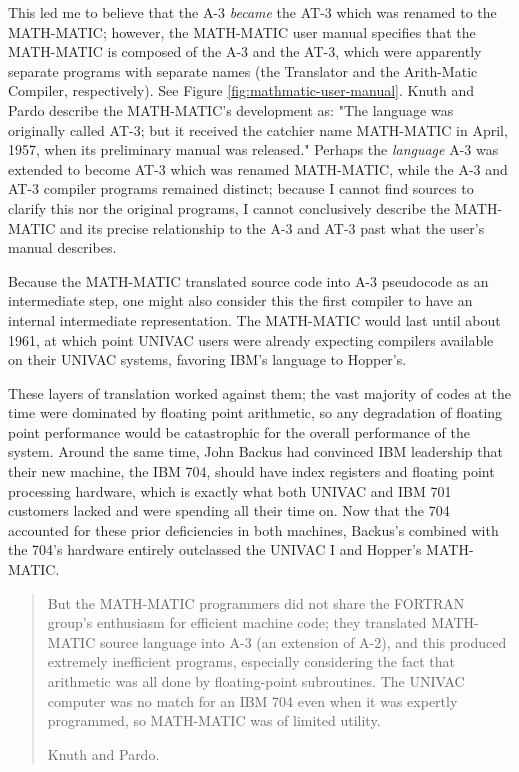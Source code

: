 This led me to believe that the A-3 \textit{became} the AT-3 which was
renamed to the MATH-MATIC; however, the MATH-MATIC user manual
\cite{ash_etal_1957_math-matic_manual} specifies that the MATH-MATIC
is composed of the A-3 and the AT-3, which were apparently separate
programs with separate names (the Translator and the Arith-Matic Compiler,
respectively).
See Figure \ref{fig:mathmatic-user-manual}.
Knuth and Pardo describe the MATH-MATIC's development as:
"The language was originally called AT-3; but it received the catchier name
MATH-MATIC in April, 1957, when its preliminary manual was released."
\cite{Knuth_TrabbPardo_1976_Early_Development}
Perhaps the \textit{language} A-3 was extended to become AT-3 which was
renamed MATH-MATIC, while the A-3 and AT-3 compiler programs remained
distinct; because I cannot find sources to clarify this nor the
original programs, I cannot conclusively describe the MATH-MATIC
and its precise relationship to the A-3 and AT-3 past what the
user's manual describes.

Because the MATH-MATIC translated source code into A-3 pseudocode
as an intermediate step, one might also consider this the first compiler
to have an internal intermediate representation.
The MATH-MATIC would last until about 1961, at which point UNIVAC users
were already expecting \FTN{} compilers available on their UNIVAC systems,
favoring IBM's language to Hopper's.

These layers of translation worked against them; the vast majority
of codes at the time were dominated by floating point arithmetic,
so any degradation of floating point performance would be catastrophic for the
overall performance of the system.
Around the same time, John Backus had convinced IBM leadership that
their new machine, the IBM 704, should have index registers and floating point
processing hardware, which is exactly what both UNIVAC and IBM 701 customers
lacked and were spending all their time on.
Now that the 704 accounted for these prior deficiencies in both machines,
Backus's \FTN{} combined with the 704's hardware entirely outclassed the
UNIVAC I and Hopper's MATH-MATIC.

\begin{quotation}
	But the MATH-MATIC programmers did not share the FORTRAN group's enthusiasm for
	efficient machine code; they translated MATH-MATIC source language into A-3 (an
	extension of A-2), and this produced extremely inefficient programs, especially
	considering the fact that arithmetic was all done by floating-point
	subroutines. The UNIVAC computer was no match for an IBM 704 even when it was
	expertly programmed, so MATH-MATIC was of limited utility.

	Knuth and Pardo\cite{Knuth_TrabbPardo_1976_Early_Development}.
\end{quotation}

